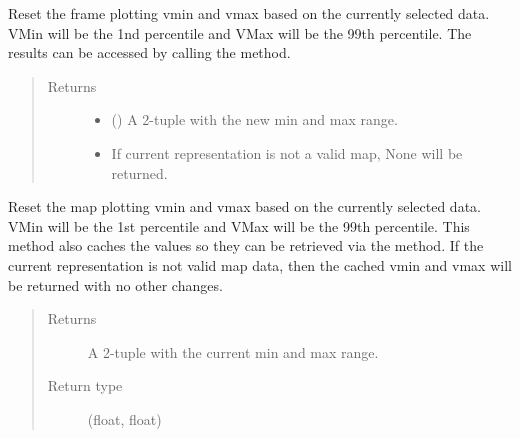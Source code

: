 \documentclass[letterpaper,10pt,english]{sphinxmanual}
\begin{document}
\begin{fulllineitems}
\begin{fulllineitems}
\label{\detokenize{xanespy:xanespy.qt_frameset_presenter.QtFramesetPresenter.reset_frame_range}}
Reset the frame plotting vmin and vmax based on the currently
selected data. VMin will be the 1nd percentile and VMax will
be the 99th percentile. The results can be accessed by calling
the  method.
\begin{quote}\begin{description}
\item[{Returns}] \leavevmode
\begin{itemize}
\item {} 
 () \textendash{} A 2-tuple with the new min and max range.

\item {} 
 \textendash{} If current representation is not a valid map, None will be
returned.

\end{itemize}


\end{description}\end{quote}

\end{fulllineitems}


\begin{fulllineitems}
\label{\detokenize{xanespy:xanespy.qt_frameset_presenter.QtFramesetPresenter.reset_map_range}}
Reset the map plotting vmin and vmax based on the currently
selected data. VMin will be the 1st percentile and VMax will
be the 99th percentile. This method also caches the values so
they can be retrieved via the  method. If the
current representation is not valid map data, then the cached
vmin and vmax will be returned with no other changes.
\begin{quote}\begin{description}
\item[{Returns}] \leavevmode
{} \textendash{} A 2-tuple with the current min and max range.

\item[{Return type}] \leavevmode
(float, float)


\end{description}
\end{quote}
\end{fulllineitems}
\end{fulllineitems}
\end{document}
